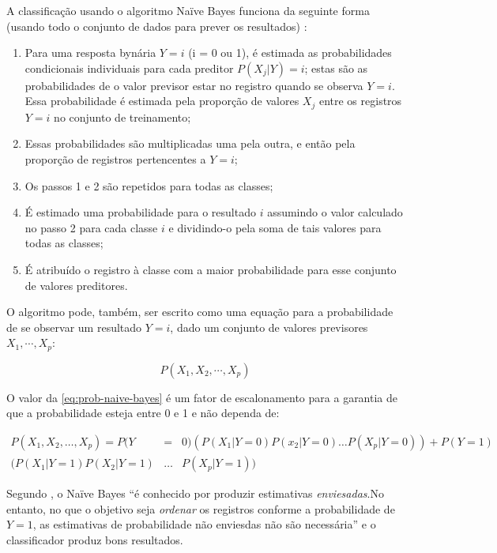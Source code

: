 A classificação usando o algoritmo Naïve Bayes funciona da seguinte forma (usando todo o conjunto de dados para prever os resultados) \cite{bruce_estatistica_2019}:
\begin{enumerate}
	\item Para uma resposta bynária $ Y = i$ (i = 0 ou 1), é estimada as probabilidades condicionais individuais para cada preditor $  P(X_j | Y) = i $; estas são as probabilidades de o valor previsor estar no registro quando se observa $ Y = i $. Essa probabilidade é estimada pela proporção de valores $ X_j $ entre os registros $ Y = i $ no conjunto de treinamento;
	\item Essas probabilidades são multiplicadas uma pela outra, e então pela proporção de registros pertencentes a $ Y = i $;
	\item Os passos 1 e 2 são repetidos para todas as classes;
	\item É estimado uma probabilidade para o resultado $ i $ assumindo o valor calculado no passo 2 para cada classe $ i $ e dividindo-o pela soma de tais valores para todas as classes;
	\item É atribuído o registro à classe com a maior probabilidade para esse conjunto de valores preditores.
\end{enumerate}

O algoritmo pode, também, ser escrito como uma equação para a probabilidade de se observar um resultado $ Y = i $, dado um conjunto de valores previsores $ X_1, \cdots, X_p $:

\begin{equation}\label{eq:prob-naive-bayes}
  P(X_1, X_2, \cdots, X_p)
\end{equation} 

O valor da \autoref{eq:prob-naive-bayes} é um fator de escalonamento para a garantia de que a probabilidade esteja entre 0 e 1 e não dependa de:

\begin{eqnarray}
P(X_1, X_2, \dots, X_p)=P(Y&=&0)(P(X_1 | Y = 0)P(x_2 | Y = 0) \dots P(X_p| Y = 0)) + P(Y=1)\nonumber\\
(P(X_1 | Y = 1)P(X_2 | Y = 1) &\dots &P(X_p | Y = 1))\end{eqnarray}

Segundo , o Naïve Bayes ``é conhecido por produzir estimativas \textit{enviesadas}.No entanto, no que o objetivo seja \textit{ordenar} os registros conforme a probabilidade de $ Y = 1 $, as estimativas de probabilidade não enviesdas não são necessária'' e o classificador produz bons resultados.

